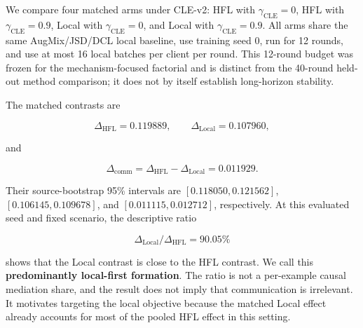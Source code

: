 \documentclass[10pt,twocolumn]{article}
\begin{document}
We compare four matched arms under CLE-v2: HFL with \(\gamma_{\mathrm{CLE}}=0\), HFL with \(\gamma_{\mathrm{CLE}}=0.9\), Local with \(\gamma_{\mathrm{CLE}}=0\), and Local with \(\gamma_{\mathrm{CLE}}=0.9\). All arms share the same AugMix/JSD/DCL local baseline, use training seed 0, run for 12 rounds, and use at most 16 local batches per client per round. This 12-round budget was frozen for the mechanism-focused factorial and is distinct from the 40-round held-out method comparison; it does not by itself establish long-horizon stability.

\begin{table}[t]
\centering
\small
\caption{CLE formation and matched local-first attribution. Source-bootstrap intervals condition on the trained checkpoints.}
\label{tab:auto1}
\end{table}

The matched contrasts are

\[
\Delta_{\mathrm{HFL}}=0.119889,\qquad
\Delta_{\mathrm{Local}}=0.107960,
\]

and

\[
\Delta_{\mathrm{comm}}
=\Delta_{\mathrm{HFL}}-\Delta_{\mathrm{Local}}
=0.011929.
\]

Their source-bootstrap 95\% intervals are \([0.118050,0.121562]\), \([0.106145,0.109678]\), and \([0.011115,0.012712]\), respectively. At this evaluated seed and fixed scenario, the descriptive ratio

\[
\Delta_{\mathrm{Local}}/\Delta_{\mathrm{HFL}}=90.05\%
\]

shows that the Local contrast is close to the HFL contrast. We call this \textbf{predominantly local-first formation}. The ratio is not a per-example causal mediation share, and the result does not imply that communication is irrelevant. It motivates targeting the local objective because the matched Local effect already accounts for most of the pooled HFL effect in this setting.
\end{document}
